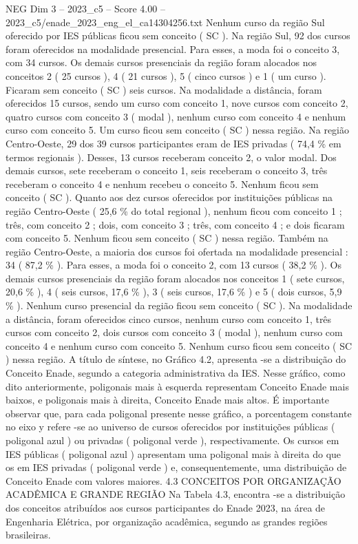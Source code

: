 \begin{textsample}{NEG Dim 3 – 2023\_c5 – Score 4.00 – 2023\_c5/enade\_2023\_eng\_el\_ca14304256.txt}
Nenhum curso da região Sul oferecido por IES públicas ficou sem conceito ( SC ).
Na região Sul, 92 dos cursos foram oferecidos na modalidade presencial.
Para esses, a moda foi o conceito 3, com 34 cursos.
Os demais cursos presenciais da região foram alocados nos conceitos 2 ( 25 cursos ), 4 ( 21 cursos ), 5 ( cinco cursos ) e 1 ( um curso ).
Ficaram sem conceito ( SC ) seis cursos.
Na modalidade a distância, foram oferecidos 15 cursos, sendo um curso com conceito 1, nove cursos com conceito 2, quatro cursos com conceito 3 ( modal ), nenhum curso com conceito 4 e nenhum curso com conceito 5.
Um curso ficou sem conceito ( SC ) nessa região.
Na região Centro-Oeste, 29 dos 39 cursos participantes eram de IES privadas ( 74,4 \% em termos regionais ).
Desses, 13 cursos receberam conceito 2, o valor modal.
Dos demais cursos, sete receberam o conceito 1, seis receberam o conceito 3, três receberam o conceito 4 e nenhum recebeu o conceito 5.
Nenhum ficou sem conceito ( SC ).
Quanto aos dez cursos oferecidos por instituições públicas na região Centro-Oeste ( 25,6 \% do total regional ), nenhum ficou com conceito 1 ; três, com conceito 2 ; dois, com conceito 3 ; três, com conceito 4 ; e dois ficaram com conceito 5.
Nenhum ficou sem conceito ( SC ) nessa região.
Também na região Centro-Oeste, a maioria dos cursos foi ofertada na modalidade presencial : 34 ( 87,2 \% ).
Para esses, a moda foi o conceito 2, com 13 cursos ( 38,2 \% ).
Os demais cursos presenciais da região foram alocados nos conceitos 1 ( sete cursos, 20,6 \% ), 4 ( seis cursos, 17,6 \% ), 3 ( seis cursos, 17,6 \% ) e 5 ( dois cursos, 5,9 \% ).
Nenhum curso presencial da região ficou sem conceito ( SC ).
Na modalidade a distância, foram oferecidos cinco cursos, nenhum curso com conceito 1, três cursos com conceito 2, dois cursos com conceito 3 ( modal ), nenhum curso com conceito 4 e nenhum curso com conceito 5.
Nenhum curso ficou sem conceito ( SC ) nessa região.
A título de síntese, no Gráfico 4.2, apresenta -se a distribuição do Conceito Enade, segundo a categoria administrativa da IES.
Nesse gráfico, como dito anteriormente, poligonais mais à esquerda representam Conceito Enade mais baixos, e poligonais mais à direita, Conceito Enade mais altos.
É importante observar que, para cada poligonal presente nesse gráfico, a porcentagem constante no eixo y refere -se ao universo de cursos oferecidos por instituições públicas ( poligonal azul ) ou privadas ( poligonal verde ), respectivamente.
Os cursos em IES públicas ( poligonal azul ) apresentam uma poligonal mais à direita do que os em IES privadas ( poligonal verde ) e, consequentemente, uma distribuição de Conceito Enade com valores maiores. 4.3 CONCEITOS POR ORGANIZAÇÃO ACADÊMICA E GRANDE REGIÃO Na Tabela 4.3, encontra -se a distribuição dos conceitos atribuídos aos cursos participantes do Enade 2023, na área de Engenharia Elétrica, por organização acadêmica, segundo as grandes regiões brasileiras.

\end{textsample}
